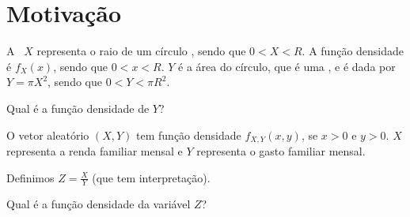 \section{Motivação}

\begin{example}\label{exp:ch04-fdp-area}
    A \va\ $X$ representa o raio de um círculo , sendo que $0 < X < R$.
    A função densidade é $f_X(x)$, sendo que $0 < x < R$.
    $Y$ é a área do círculo, que é uma \va, e é dada por $Y = \pi X^2$,
    sendo que $0 < Y < \pi R^2$.

    \bigskip
    Qual é a função densidade de $Y$?
\end{example}

\begin{example}\label{exp:ch04-fdp-gasto-per-capita}
    O vetor aleatório $(X, Y)$ tem função densidade $f_{X, Y}(x, y)$,
    se $x > 0$ e $y > 0$.
    $X$ representa a renda familiar mensal e $Y$ representa o
    gasto familiar mensal.

    Definimos $Z = \frac{X}{Y}$ (que tem interpretação).

    \bigskip
    Qual é a função densidade da variável $Z$?
\end{example}